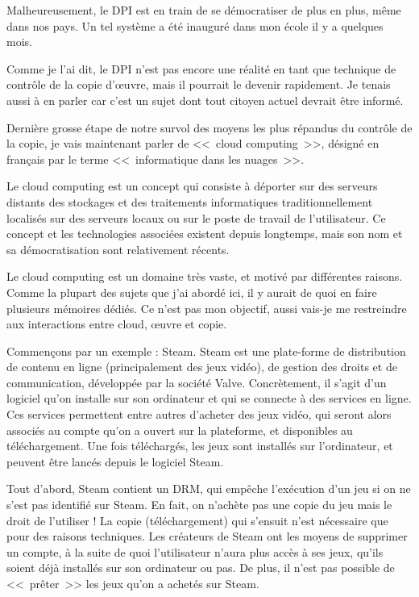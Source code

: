 Malheureusement, le DPI est en train de se démocratiser de plus en plus, même dans nos pays.
Un tel système a été inauguré dans mon école il y a quelques mois.

Comme je l'ai dit, le DPI n'est pas encore une réalité en tant que technique de contrôle de la copie d'œuvre, mais il pourrait le devenir rapidement.
Je tenais aussi à en parler car c'est un sujet dont tout citoyen actuel devrait être informé.

Dernière grosse étape de notre survol des moyens les plus répandus du contrôle de la copie, je vais maintenant parler de <<~cloud computing~>>, désigné en français par le terme <<~informatique dans les nuages~>>.

Le cloud computing est un concept qui consiste à déporter sur des serveurs distants des stockages et des traitements informatiques traditionnellement localisés sur des serveurs locaux ou sur le poste de travail de l'utilisateur.
Ce concept et les technologies associées existent depuis longtemps, mais son nom et sa démocratisation sont relativement récents.

Le cloud computing est un domaine très vaste, et motivé par différentes raisons.
Comme la plupart des sujets que j'ai abordé ici, il y aurait de quoi en faire plusieurs mémoires dédiés.
Ce n'est pas mon objectif, aussi vais-je me restreindre aux interactions entre cloud, œuvre et copie.

Commençons par un exemple : Steam.
Steam est une plate-forme de distribution de contenu en ligne (principalement des jeux vidéo), de gestion des droits et de communication, développée par la société Valve.
Concrètement, il s'agit d'un logiciel qu'on installe sur son ordinateur et qui se connecte à des services en ligne.
Ces services permettent entre autres d'acheter des jeux vidéo, qui seront alors associés au compte qu'on a ouvert sur la plateforme, et disponibles au téléchargement.
Une fois téléchargés, les jeux sont installés sur l'ordinateur, et peuvent être lancés depuis le logiciel Steam.

Tout d'abord, Steam contient un DRM, qui empêche l'exécution d'un jeu si on ne s'est pas identifié sur Steam.
En fait, on n'achète pas une copie du jeu mais le droit de l'utiliser !
La copie (téléchargement) qui s'ensuit n'est nécessaire que pour des raisons techniques.
Les créateurs de Steam ont les moyens de supprimer un compte, à la suite de quoi l'utilisateur n'aura plus accès à ses jeux, qu'ils soient déjà installés sur son ordinateur ou pas.
De plus, il n'est pas possible de <<~prêter~>> les jeux qu'on a achetés sur Steam.

